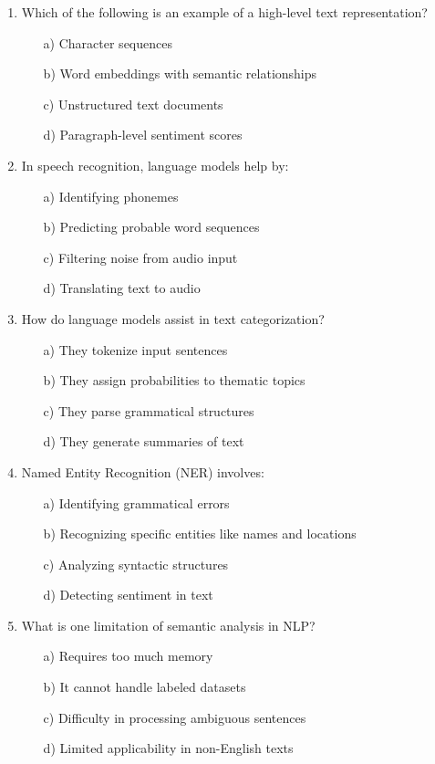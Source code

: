 \documentclass[8pt]{extarticle}
\begin{document}
\begin{multicols}{2}
\begin{enumerate}
\item Which of the following is an example of a high-level text representation?
\begin{itemize}
    \item[a)] Character sequences
    \item[b)] Word embeddings with semantic relationships
    \item[c)] Unstructured text documents
    \item[d)] Paragraph-level sentiment scores
\end{itemize}

\item In speech recognition, language models help by:
\begin{itemize}
    \item[a)] Identifying phonemes
    \item[b)] Predicting probable word sequences
    \item[c)] Filtering noise from audio input
    \item[d)] Translating text to audio
\end{itemize}

\item How do language models assist in text categorization?
\begin{itemize}
    \item[a)] They tokenize input sentences
    \item[b)] They assign probabilities to thematic topics
    \item[c)] They parse grammatical structures
    \item[d)] They generate summaries of text
\end{itemize}

\item Named Entity Recognition (NER) involves:
\begin{itemize}
    \item[a)] Identifying grammatical errors
    \item[b)] Recognizing specific entities like names and locations
    \item[c)] Analyzing syntactic structures
    \item[d)] Detecting sentiment in text
\end{itemize}

\item What is one limitation of semantic analysis in NLP?
\begin{itemize}
    \item[a)] Requires too much memory
    \item[b)] It cannot handle labeled datasets
    \item[c)] Difficulty in processing ambiguous sentences
    \item[d)] Limited applicability in non-English texts
\end{itemize}


\end{enumerate}
\end{multicols}
\end{document}

